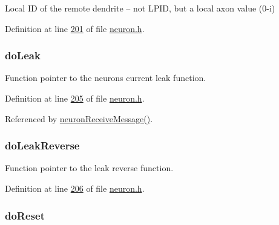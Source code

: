 Local I\+D of the remote dendrite -- not L\+P\+I\+D, but a local axon value (0-\/i) 



Definition at line \hyperlink{neuron_8h_source_l00201}{201} of file \hyperlink{neuron_8h_source}{neuron.\+h}.

\hypertarget{structneuron_state_aa430f424f34dc59dc27736e27ec61320}{}
\subsubsection[{do\+Leak}]{ do\+Leak}\label{structneuron_state_aa430f424f34dc59dc27736e27ec61320}


Function pointer to the neuron\textquotesingle{}s current leak function. 



Definition at line \hyperlink{neuron_8h_source_l00205}{205} of file \hyperlink{neuron_8h_source}{neuron.\+h}.



Referenced by \hyperlink{neuron_8c_source_l00103}{neuron\+Receive\+Message()}.

\hypertarget{structneuron_state_af4ded7f575b64ada6c0a6664f638307c}{}
\subsubsection[{do\+Leak\+Reverse}]{ do\+Leak\+Reverse}\label{structneuron_state_af4ded7f575b64ada6c0a6664f638307c}


Function pointer to the leak reverse function. 



Definition at line \hyperlink{neuron_8h_source_l00206}{206} of file \hyperlink{neuron_8h_source}{neuron.\+h}.

\hypertarget{structneuron_state_afcf9d931e4fda519c43b4efeab687463}{}
\subsubsection[{do\+Reset}]{ do\+Reset}\label{structneuron_state_afcf9d931e4fda519c43b4efeab687463}


